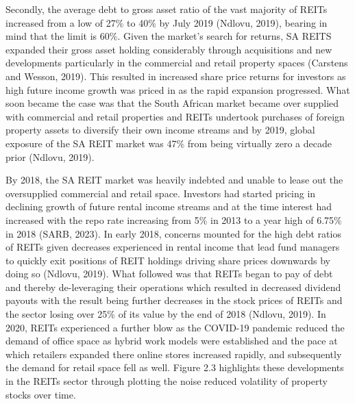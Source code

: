 \documentclass[11pt,preprint, authoryear]{elsarticle}
\numberwithin{equation}{section}
\numberwithin{figure}{section}
\numberwithin{table}{section}
\begin{document}
Secondly, the average debt to gross asset ratio of the vast majority of
REITs increased from a low of 27\% to 40\% by July 2019 (Ndlovu, 2019),
bearing in mind that the limit is 60\%. Given the market's search for
returns, SA REITS expanded their gross asset holding considerably
through acquisitions and new developments particularly in the commercial
and retail property spaces (Carstens and Wesson, 2019). This resulted in
increased share price returns for investors as high future income growth
was priced in as the rapid expansion progressed. What soon became the
case was that the South African market became over supplied with
commercial and retail properties and REITs undertook purchases of
foreign property assets to diversify their own income streams and by
2019, global exposure of the SA REIT market was 47\% from being
virtually zero a decade prior (Ndlovu, 2019).

By 2018, the SA REIT market was heavily indebted and unable to lease out
the oversupplied commercial and retail space. Investors had started
pricing in declining growth of future rental income streams and at the
time interest had increased with the repo rate increasing from 5\% in
2013 to a year high of 6.75\% in 2018 (SARB, 2023). In early 2018,
concerns mounted for the high debt ratios of REITs given decreases
experienced in rental income that lead fund managers to quickly exit
positions of REIT holdings driving share prices downwards by doing so
(Ndlovu, 2019). What followed was that REITs began to pay of debt and
thereby de-leveraging their operations which resulted in decreased
dividend payouts with the result being further decreases in the stock
prices of REITs and the sector losing over 25\% of its value by the end
of 2018 (Ndlovu, 2019). In 2020, REITs experienced a further blow as the
COVID-19 pandemic reduced the demand of office space as hybrid work
models were established and the pace at which retailers expanded there
online stores increased rapidly, and subsequently the demand for retail
space fell as well. Figure 2.3 highlights these developments in the
REITs sector through plotting the noise reduced volatility of property
stocks over time.
\end{document}
